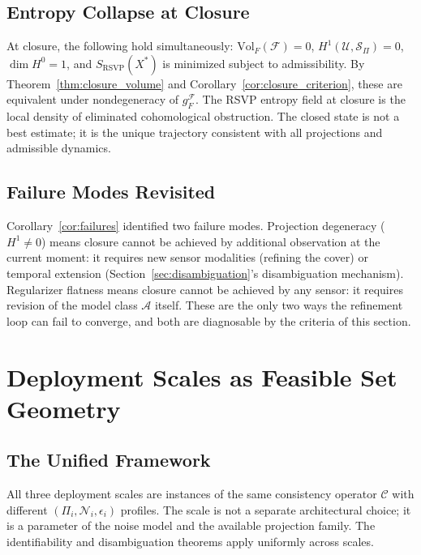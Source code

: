 \documentclass[12pt, oneside]{article}
\begin{document}
\subsection{Entropy Collapse at Closure}

At closure, the following hold simultaneously:
$\mathrm{Vol}_F(\mathcal{F}) = 0$, $H^1(\mathcal{U}, \mathcal{S}_\Pi) = 0$,
$\dim H^0 = 1$, and $S_{\mathrm{RSVP}}(X^*)$ is minimized subject to admissibility.
By Theorem~\ref{thm:closure_volume} and Corollary~\ref{cor:closure_criterion}, these are
equivalent under nondegeneracy of $g_F^{\mathcal{F}}$. The RSVP entropy field at closure
is the local density of eliminated cohomological obstruction. The closed state is not a
best estimate; it is the unique trajectory consistent with all projections and admissible
dynamics.

\subsection{Failure Modes Revisited}

Corollary~\ref{cor:failures} identified two failure modes. Projection degeneracy
($H^1 \ne 0$) means closure cannot be achieved by additional observation at the current
moment: it requires new sensor modalities (refining the cover) or temporal extension
(Section~\ref{sec:disambiguation}'s disambiguation mechanism). Regularizer flatness means
closure cannot be achieved by any sensor: it requires revision of the model class
$\mathcal{A}$ itself. These are the only two ways the refinement loop can fail to
converge, and both are diagnosable by the criteria of this section.

\section{Deployment Scales as Feasible Set Geometry}
\label{sec:deployment}

\subsection{The Unified Framework}

All three deployment scales are instances of the same consistency operator $\mathcal{C}$
with different $(\Pi_i, \mathcal{N}_i, \epsilon_i)$ profiles. The scale is not a
separate architectural choice; it is a parameter of the noise model and the available
projection family. The identifiability and disambiguation theorems apply uniformly across
scales.
\end{document}
